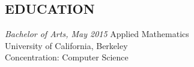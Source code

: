 \documentclass[margin, 8pt]{res} %
\begin{document}
\begin{resume}

 



\section{EDUCATION}

{\sl Bachelor of Arts, May 2015} Applied Mathematics\\
University of California, Berkeley \\
Concentration: Computer Science\\
 


 
 

\end{resume}
\end{document}
